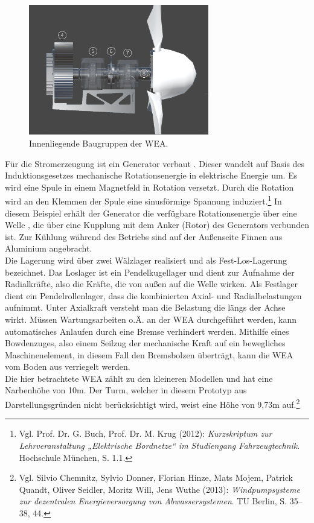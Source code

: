 \begin{figure}[H]
	\centering
	\captionsetup{width=0.7\textwidth}
	\includegraphics[keepaspectratio, width=0.7\textwidth]{bildquellen/WEA2_2}
	\caption{Innenliegende Baugruppen der WEA.}
	\label{fig:2}
\end{figure}

Für die Stromerzeugung ist ein Generator verbaut . Dieser wandelt auf Basis des Induktionsgesetzes mechanische Rotationsenergie in elektrische Energie um. Es wird eine Spule in einem Magnetfeld in Rotation versetzt. Durch die Rotation wird an den Klemmen der Spule eine sinusförmige Spannung induziert.\footnote{Vgl. Prof. Dr. G. Buch, Prof. Dr. M. Krug  (2012): \textit{Kurzskriptum zur Lehrveranstaltung „Elektrische Bordnetze“ im Studiengang Fahrzeugtechnik}. Hochschule München, S. 1.1.} In diesem Beispiel erhält der Generator die verfügbare Rotationsenergie über eine Welle , die über eine Kupplung mit dem Anker (Rotor) des Generators verbunden ist. Zur Kühlung während des Betriebs sind auf der Außenseite Finnen aus Aluminium angebracht.\\
Die Lagerung wird über zwei Wälzlager realisiert und als Fest-Los-Lagerung bezeichnet. Das Loslager ist ein Pendelkugellager  und dient zur Aufnahme der Radialkräfte, also die Kräfte, die von außen auf die Welle wirken. Als Festlager dient ein Pendelrollenlager,  dass die kombinierten Axial- und Radialbelastungen aufnimmt. Unter Axialkraft versteht man die Belastung die längs der Achse wirkt.
Müssen Wartungsarbeiten o.Ä. an der WEA durchgeführt werden, kann automatisches Anlaufen durch eine Bremse  verhindert werden. Mithilfe eines Bowdenzuges, also einem Seilzug der mechanische Kraft auf ein bewegliches Maschinenelement, in diesem Fall den Bremsbolzen überträgt, kann die WEA vom Boden aus verriegelt werden. \\
Die hier betrachtete WEA zählt zu den kleineren Modellen und hat eine Narbenhöhe von 10m. Der Turm, welcher in diesem Prototyp aus Darstellungsgründen nicht berücksichtigt wird, weist eine Höhe von 9,73m auf.\footnote{Vgl. Silvio Chemnitz, Sylvio Donner, Florian Hinze, Mats Mojem, Patrick Quandt, Oliver Seidler, Moritz Will, Jens Wuthe (2013): \textit{Windpumpsysteme zur dezentralen Energieversorgung von Abwassersystemen}. TU Berlin, S. 35--38, 44.} 
   


